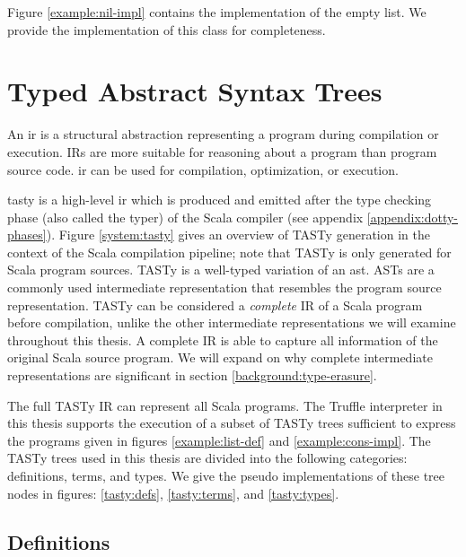 Figure \ref{example:nil-impl} contains the implementation of the empty list. 
We provide the implementation of this class for completeness.

\section{Typed Abstract Syntax Trees}

An \acrfull{ir} is a structural abstraction representing a program during compilation or execution. 
IRs are more suitable for reasoning about a program than program source code. 
\acrshort{ir} can be used for compilation\cite{llvm}, optimization\cite{llvm,ssa}, or execution\cite{java:vm-spec,clr:spec}.

\acrfull{tasty} is a high-level \acrshort{ir} which is produced and emitted after the type checking phase (also called the typer) of the Scala compiler (see appendix \ref{appendix:dotty-phases}).
Figure \ref{system:tasty} gives an overview of TASTy generation in the context of the Scala compilation pipeline; note that TASTy is only generated for Scala program sources.
TASTy is a well-typed variation of an \acrfull{ast}.
ASTs are a commonly used intermediate representation that resembles the program source representation.
TASTy can be considered a \textit{complete} IR of a Scala program before compilation, unlike the other intermediate representations we will examine throughout this thesis.
A complete IR is able to capture all information of the original Scala source program.
We will expand on why complete intermediate representations are significant in section \ref{background:type-erasure}.

The full TASTy IR can represent all Scala programs.
The Truffle interpreter in this thesis supports the execution of a subset of TASTy trees sufficient to express the programs given in figures \ref{example:list-def} and \ref{example:cons-impl}.
The TASTy trees used in this thesis are divided into the following categories: definitions, terms, and types. 
We give the pseudo implementations of these tree nodes in figures: \ref{tasty:defs}, \ref{tasty:terms}, and \ref{tasty:types}.

\subsection{Definitions}

